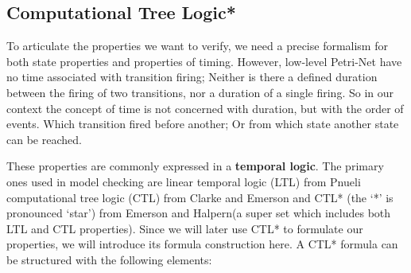 \subsection{Computational Tree Logic*}
\label{rel_ctl}
To articulate the properties we want to verify, we need a precise formalism for both state properties and properties of timing.
However, low-level Petri-Net have no time associated with transition firing;
Neither is there a defined duration between the firing of two transitions, nor a duration of a single firing.
So in our context the concept of time is not concerned with duration, but with the order of events.
Which transition fired before another; Or from which state another state can be reached.

These properties are commonly expressed in a \textbf{temporal logic}.
The primary ones used in model checking are linear temporal logic (LTL) from Pnueli\cite{pnueli1977temporal} computational tree logic (CTL) from Clarke and Emerson\cite{clarke1981design} and CTL* (the `*' is pronounced `star') from Emerson and Halpern\cite{emerson1985decision}(a super set which includes both LTL and CTL properties).
Since we will later use CTL* to formulate our properties, we will introduce its formula construction here.
A CTL* formula can be structured with the following elements:
